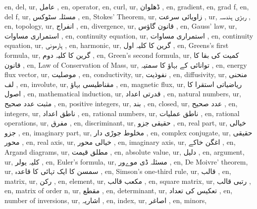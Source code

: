 en, del,
ur, عامل ,
en, operator,
en, curl,
ur, ڈھلوان  ,
en, gradient,
en, grad f,
en, del f,
ur, مسئلہ سٹوکس  ,
en, Stokes' Theorem,
ur, زاویائی سرعت ,
ur, ربڑی ہندسہ ,
en, topology,
ur,  انفراج ,
en, divergence,
ur, قانون گاؤس ,
en, Gauss' law,
ur, استمراری مساوات ,
en, continuity equation,
ur, استمراری مساوات  ,
en, continuity equation,
ur, ہارمونی  ,
en, harmonic,
ur, گرین کا کلیہ اول  ,
en, Greens's first formula,
ur, گرین کا کلیہ دوم  ,
en, Green's second formula,
ur, کمیت کی بقا کا قانون  ,
en, Law of Conservation of Mass,
ur, توانائی کے بہاؤ کا سمتیہ  ,
en, energy flux vector,
ur, موصلیت  ,
en, conductivity,
ur, نفوذیت  ,
en, diffusivity,
ur, منحنی لف  ,
en, involute,
ur, مقناطیسی بہاؤ  ,
en, magnetic flux,
ur, ریاضیاتی استقرا کا اصول ,
en, mathematical induction,
ur, قدرتی اعداد  ,
en, natural numbers,
ur, مثبت عدد صحیح  ,
en, positive integers,
ur, بند  ,
en, closed,
ur, عدد صحیح ,
en, integers,
ur, ناطق اعداد  ,
en, rational numbers,
ur, ناطق عملیات ,
en, rational operations,
ur, مفرق ,
en, discriminant,
ur, حقیقی جزو  ,
en, real part,
ur, خیالی جزو  ,
en, imaginary part,
ur, مخلوط جوڑی دار ,
en, complex conjugate,
ur, حقیقی محور ,
en, real axis,
ur, خیالی محور ,
en, imaginary axis,
ur, اغگن خاکے  ,
en, Argand diagrams,
ur, مطلق قیمت  ,
en, absolute value,
ur, دلیل  ,
en, argument,
ur, کلیہ یولر  ,
en, Euler's formula,
ur, مسئلہ ڈی موےور ,
en, De Moivre' theorem,
ur, سمسن کا ایک تہائی کا قاعدہ  ,
en, Simson's one-third rule,
ur, قالب  ,
en, matrix,
ur,  رکن ,
en, element,
ur, مکعب قالب  ,
en, square matrix,
ur,  رتبی قالب ,
en, matrix of order n,
ur, مقطع  ,
en, determinant,
ur, تعکیس کی تعداد  ,
en, number of inversions,
ur, اشاریہ  ,
en, index,
ur, اصاغر  ,
en, minors,
